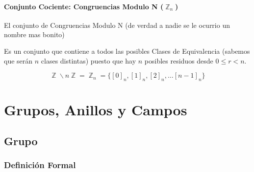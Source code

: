 \documentclass[12pt]{report}                                    %
\DeclareMathOperator \Integers  {\mathbb{Z}}                     %
\begin{document}
            \subsubsection*{Conjunto Cociente: Congruencias Modulo N ($\Integers_n$)}

                El conjunto de Congruencias Modulo N (de verdad a nadie se le ocurrio 
                un nombre mas bonito)  

                Es  un conjunto que contiene a todos las posibles Clases de Equivalencia
                (sabemos que serán $n$ clases distintas) puesto que hay $n$ posibles residuos
                desde $0 \leq r < n$.

                \begin{equation}
                    \Integers \backslash n \Integers = 
                        \Integers_n = \{ [0]_n , [1]_n, [2]_n, \dots  [n-1]_n\}
                \end{equation}







\chapter{Grupos, Anillos y Campos}
    \clearpage


    \clearpage
    \section{Grupo}

        \subsection*{Definición Formal}
\end{document}
